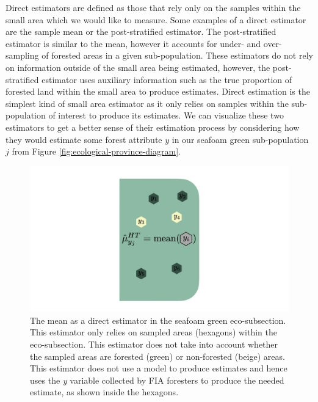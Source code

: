 \documentclass[12pt,twoside]{reedthesis}
\begin{document}
Direct estimators are defined as those that rely only on the samples within the small area which we would like to measure. Some examples of a direct estimator are the sample mean or the post-stratified estimator. The post-stratified estimator is similar to the mean, however it accounts for under- and over-sampling of forested areas in a given sub-population. These estimators do not rely on information outside of the small area being estimated, however, the post-stratified estimator uses auxiliary information such as the true proportion of forested land within the small area to produce estimates. Direct estimation is the simplest kind of small area estimator as it only relies on samples within the sub-population of interest to produce its estimates. We can visualize these two estimators to get a better sense of their estimation process by considering how they would estimate some forest attribute \(y\) in our seafoam green sub-population \(j\) from Figure \ref{fig:ecological-province-diagram}.
\begin{figure}

{\centering \includegraphics[width=1\linewidth]{figure/mean-diagram} 

}

\caption[The mean as a direct estimator]{The mean as a direct estimator in the seafoam green eco-subsection. This estimator only relies on sampled areas (hexagons) within the eco-subsection. This estimator does not take into account whether the sampled areas are forested (green) or non-forested (beige) areas. This estimator does not use a model to produce estimates and hence uses the \textit{y} variable collected by FIA foresters to produce the needed estimate, as shown inside the hexagons.}\label{fig:mean-diagram}
\end{figure}
\clearpage
\end{document}
